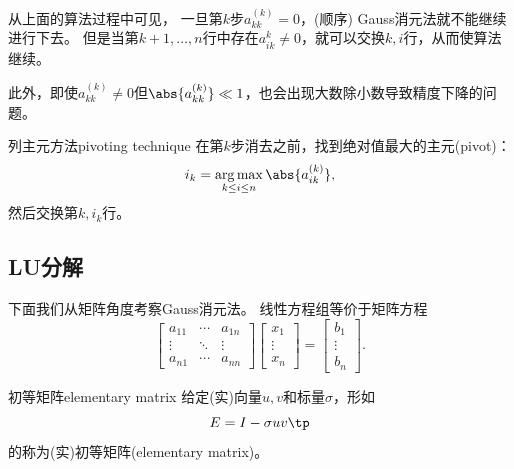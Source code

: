 \begin{remark}
    从上面的算法过程中可见，
    一旦第$k$步$a_{kk}^{(k)}=0$，(顺序) Gauss消元法就不能继续进行下去。
    但是当第$k+1,\ldots,n$行中存在$a_{ik}^{k}\neq 0$，就可以交换$k,i$行，从而使算法继续。
\end{remark}

\begin{remark}
    此外，即使$a_{kk}^{(k)}\neq 0$但$\abs{a_{kk}^{(k)}}\ll 1$，也会出现大数除小数导致精度下降的问题。
\end{remark}

\begin{theorem}
    {列主元方法}{pivoting technique}
    在第$k$步消去之前，找到绝对值最大的主元(pivot)：
    \begin{equation}
        i_k=\mathop{\arg\max}\limits_{k\leq i\leq n}\abs{a_{ik}^{(k)}},
    \end{equation}
    然后交换第$k,i_k$行。
\end{theorem}

\subsection{LU分解}

下面我们从矩阵角度考察Gauss消元法。
线性方程组等价于矩阵方程
\begin{equation}
    \begin{bmatrix}
        a_{11}&\cdots&a_{1n}\\
        \vdots&\ddots&\vdots\\
        a_{n1}&\cdots&a_{nn}
    \end{bmatrix}\begin{bmatrix}
        x_1\\\vdots\\x_n
    \end{bmatrix}=\begin{bmatrix}
        b_1\\\vdots\\b_n
    \end{bmatrix}.
\end{equation}

\begin{definition}
    {初等矩阵}{elementary matrix}
    给定(实)向量$u,v$和标量$\sigma$，形如
    \begin{equation}
        E=I-\sigma uv\tp
    \end{equation}
    的称为(实)初等矩阵(elementary matrix)。
\end{definition}

